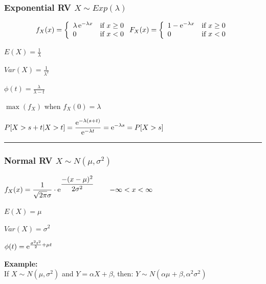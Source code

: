 \subsubsection{Exponential RV $X\sim Exp(\lambda)$ }
\begin{minipage}{10cm}

\begin{equation}
f_X(x) = \left\{ \begin{array}{ll}  \lambda\operatorname{\mathrm e}^{-\lambda x}  & \mbox{if } x\geq 0 \\ 0 & \mbox{if } x<0 \end{array} \right.\\
F_X(x) = \left\{ \begin{array}{ll}  1-\operatorname{\mathrm e}^{-\lambda x}  & \mbox{if } x\geq 0 \\ 0 & \mbox{if } x<0 \end{array} \right.\nonumber
\end{equation}

\end{minipage}
\begin{minipage}{9cm}
	\begin{liste}
		\item $E(X)=\frac {1}{\lambda}$
		\item $Var(X)=\frac {1}{\lambda^2}$
		\item $\phi(t)=\frac{\lambda}{\lambda-t}$
		\item $\max(f_X)$ when $f_X(0)=\lambda$
		\item $P[X>s+t | X>t]= \displaystyle\frac{ \operatorname{\mathrm e}^{-\lambda (s+t)} }{ \operatorname{\mathrm e}^{-\lambda t} }=\operatorname{\mathrm e}^{-\lambda s} = P[X>s]$
	\end{liste}
\end{minipage}
\hfill

\vspace{2mm}
\hrule
\vspace{3mm}

\subsubsection{Normal RV $X\sim N(\mu,\sigma^2)$ }
\begin{minipage}{10cm}
$f_X(x) = \displaystyle\frac{1}{\sqrt{2\pi}\sigma}\cdot\operatorname{\mathrm e}^{\displaystyle\frac{-(x-\mu)^2}{2\sigma^2}}\qquad -\infty <x<\infty$
\end{minipage}
\begin{minipage}{10cm}
	\begin{liste}
		\item $E(X)=\mu$
		\item $Var(X)=\sigma^2$
		\item $\phi(t)=\operatorname{\mathrm e}^{\frac{\sigma^2t^2}{2}+\mu t}$
	\end{liste}
\end{minipage}
\hfill

\textbf{Example:}\\
If $X\sim N(\mu,\sigma^2)$ and $Y=\alpha X+ \beta$, \qquad
then: $Y\sim N(\alpha\mu+\beta,\alpha^2\sigma^2)$\\



